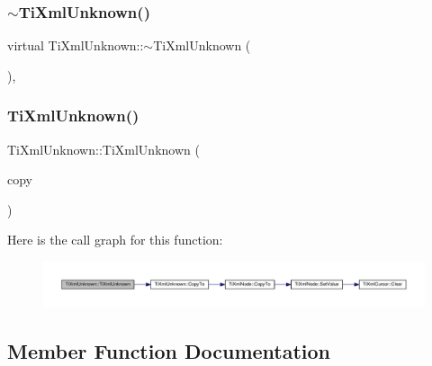 \subsubsection{\texorpdfstring{$\sim$\+Ti\+Xml\+Unknown()}{~TiXmlUnknown()}}
{\footnotesize\ttfamily virtual Ti\+Xml\+Unknown\+::$\sim$\+Ti\+Xml\+Unknown (\begin{DoxyParamCaption}{ }\end{DoxyParamCaption})\hspace{0.3cm}{\ttfamily [inline]}, {\ttfamily [virtual]}}

\mbox{\label{class_ti_xml_unknown_abe798ff4feea31474850c7f0de6bdf5e}} 
\subsubsection{\texorpdfstring{Ti\+Xml\+Unknown()}{TiXmlUnknown()}\hspace{0.1cm}{\footnotesize\ttfamily [2/2]}}
{\footnotesize\ttfamily Ti\+Xml\+Unknown\+::\+Ti\+Xml\+Unknown (\begin{DoxyParamCaption}\item[{const \hyperlink{class_ti_xml_unknown}{Ti\+Xml\+Unknown} \&}]{copy }\end{DoxyParamCaption})\hspace{0.3cm}{\ttfamily [inline]}}

Here is the call graph for this function\+:
\nopagebreak
\begin{figure}[H]
\begin{center}
\leavevmode
\includegraphics[width=350pt]{class_ti_xml_unknown_abe798ff4feea31474850c7f0de6bdf5e_cgraph}
\end{center}
\end{figure}


\subsection{Member Function Documentation}
\mbox{\label{class_ti_xml_unknown_aafdf1b2d4f561979c7907bad91004999}} 
